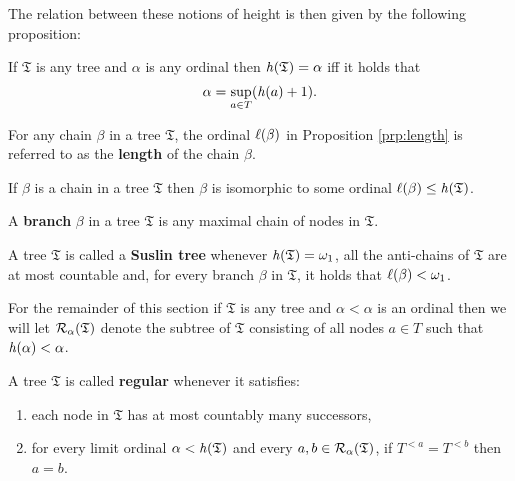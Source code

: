 The relation between these notions of height is then given by the following proposition:

\begin{prp}
	If $\mathfrak{T}$ is any tree and $\alpha$ is any ordinal then $\mathit{h}(\mathfrak{T})=\alpha$ iff it holds that
	\begin{equation}
		\alpha=\sup_{a\in T}(\mathit{h}(a)+1).
	\end{equation}
\end{prp}

\begin{dfn}[Length]
	For any chain $\beta$ in a tree $\mathfrak{T}$, the ordinal $\ell(\beta)$ in Proposition \ref{prp:length} is referred to as the \textbf{length} of the chain $\beta$.
\end{dfn}

\begin{prp}\label{prp:length}
	If $\beta$ is a chain in a tree $\mathfrak{T}$ then $\beta$ is isomorphic to some ordinal $\ell(\beta)\leq\mathit{h}(\mathfrak{T})$.
\end{prp}

\begin{dfn}[Branch]
	A \textbf{branch} $\beta$ in a tree $\mathfrak{T}$ is any maximal chain of nodes in $\mathfrak{T}$.
\end{dfn}

\begin{dfn}
	A tree $\mathfrak{T}$ is called a \textbf{Suslin tree} whenever $\mathit{h}(\mathfrak{T})=\omega_1$, all the anti-chains of $\mathfrak{T}$ are at most countable and, for every branch $\beta$ in $\mathfrak{T}$, it holds that $\ell(\beta)<\omega_1$.
\end{dfn}

For the remainder of this section if $\mathfrak{T}$ is any tree and $\alpha<\alpha$ is an ordinal then we will let $\mathcal{R}_{\alpha}(\mathfrak{T})$ denote the subtree of $\mathfrak{T}$ consisting of all nodes $a\in T$ such that $\mathit{h}(\alpha)<\alpha$.

\begin{dfn}[Regularity]
	A tree $\mathfrak{T}$ is called \textbf{regular} whenever it satisfies:
	\begin{enumerate}
		\item	each node in $\mathfrak{T}$ has at most countably many successors,
		\item	for every limit ordinal $\alpha<\mathit{h}(\mathfrak{T})$ and every $a,b\in\mathcal{R}_{\alpha}(\mathfrak{T})$, if $T^{<a}=T^{<b}$ then $a=b$.
	\end{enumerate}
\end{dfn}
